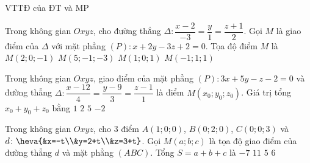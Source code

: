 \begin{dang}{VTTĐ của ĐT và MP}

\end{dang}
\begin{ex}%
Trong không gian $Oxyz$, cho đường thẳng $\Delta:\dfrac{x-2}{-3}=\dfrac{y}{1}=\dfrac{z+1}{2}$. Gọi $M$ là giao điểm của $\Delta$ với mặt phẳng $(P): x+2y-3z+2=0$. Tọa độ điểm $M$ là
\choice
{$M(2;0;-1)$}
{$M(5;-1;-3)$}
{$M(1;0;1)$}
{\True $M(-1;1;1)$}
\end{ex}

\begin{ex}%
Trong không gian $Oxyz$, giao điểm của mặt phẳng $(P):3x+5y-z-2=0$ và đường thẳng $\Delta:\dfrac{x-12}{4}=\dfrac{y-9}{3}=\dfrac{z-1}{1}$ là điểm $M\left(x_0;y_0;z_0\right)$. Giá trị tổng $x_0+y_0+z_0$ bằng
\choice
{$1$}
{$2$}
{$5$}
{\True $-2$}
\end{ex}

\begin{ex}%
Trong không gian $Oxyz$, cho $3$ điểm $A(1;0;0)$, $B(0;2;0)$, $C(0;0;3)$ và $d\colon\heva{&x=-t\\&y=2+t\\&z=3+t}$. Gọi $M(a;b;c)$ là tọa độ giao điểm của đường thẳng $d$ và mặt phẳng $(ABC)$. Tổng $S=a+b+c$ là
\choice
{$-7$}
{\True $11$}
{$5$}
{$6$}
\end{ex}

